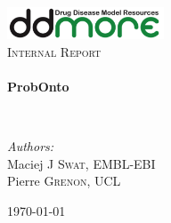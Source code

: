 \begin{titlepage}
\begin{center}

\includegraphics[width=0.35\textwidth]{./logo/ddmore_logo}~\\[1cm]

%
\textsc{\Large Internal Report}\\[0.5cm]

\HRule \\[0.4cm]
{ \huge \bfseries ProbOnto \\[0.4cm] }

\HRule \\[1.5cm]

\begin{minipage}{0.5\textwidth}
\begin{flushleft} \large
\emph{Authors:}\\
Maciej J \textsc{Swat}, EMBL-EBI\\
Pierre \textsc{Grenon}, UCL\\
\end{flushleft}
\end{minipage}


\vfill

{\large \today \\}

\end{center}
\end{titlepage}